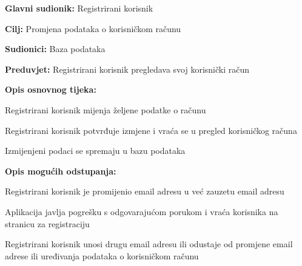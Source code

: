 				
				\noindent {}
				\begin{packed_item}
					
					\item \textbf{Glavni sudionik:} Registrirani korisnik
					\item  \textbf{Cilj:} Promjena podataka o korisničkom računu
					\item  \textbf{Sudionici:} Baza podataka
					\item  \textbf{Preduvjet:} Registrirani korisnik pregledava svoj korisnički račun
					
					\item  \textbf{Opis osnovnog tijeka:}
					\item[] \begin{packed_enum}
						\item Registrirani korisnik mijenja željene podatke o računu
						\item Registrirani korisnik potvrđuje izmjene i vraća se u pregled korisničkog računa
						\item Izmijenjeni podaci se spremaju u bazu podataka
					\end{packed_enum}
					
					\item  \textbf{Opis mogućih odstupanja:}
					\item[] \begin{packed_item}
						\item[4.a] Registrirani korisnik je promijenio email adresu u već zauzetu email adresu
						\item[] \begin{packed_enum}
							\item Aplikacija javlja pogrešku s odgovarajućom porukom i vraća korisnika na stranicu za registraciju
							\item Registrirani korisnik unosi drugu email adresu ili odustaje od promjene email adrese ili uređivanja podataka o korisničkom računu
						\end{packed_enum}
					\end{packed_item}
				\end{packed_item}
				
